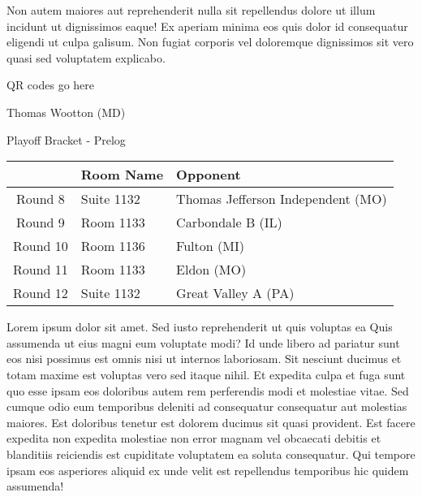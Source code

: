 \documentclass{article}%
\begin{document}
\newline%
Non autem maiores aut reprehenderit nulla sit repellendus dolore ut illum incidunt ut dignissimos eaque! Ex aperiam minima eos quis dolor id consequatur eligendi ut culpa galisum. Non fugiat corporis vel doloremque dignissimos sit vero quasi sed voluptatem explicabo.\newline%
\newline%
%
\vspace*{30pt}%
\begin{center}%
\begin{Huge}%
QR codes go here%
\end{Huge}%
\end{center}%
\newpage%
\begin{center}%
\begin{Huge}%
Thomas Wootton (MD)%
\end{Huge}%
\vspace*{8pt}%
\linebreak%
\begin{Large}%
Playoff Bracket {-} Prelog%
\end{Large}%
\end{center}%
\begin{tabularx}{\textwidth}{|c|Y|Y|}%
\hline%
&Room Name&Opponent\\%
\hline%
Round 8&Suite 1132&Thomas Jefferson Independent (MO)\\%
Round 9&Room 1133&Carbondale B (IL)\\%
Round 10&Room 1136&Fulton (MI)\\%
Round 11&Room 1133&Eldon (MO)\\%
Round 12&Suite 1132&Great Valley A (PA)\\%
\hline%
\end{tabularx}%
\vspace*{8pt}%
\linebreak%
\newline%
\newline%
Lorem ipsum dolor sit amet. Sed iusto reprehenderit ut quis voluptas ea Quis assumenda ut eius magni eum voluptate modi? Id unde libero ad pariatur sunt eos nisi possimus est omnis nisi ut internos laboriosam. Sit nesciunt ducimus et totam maxime est voluptas vero sed itaque nihil. Et expedita culpa et fuga sunt quo esse ipsam eos doloribus autem rem perferendis modi et molestiae vitae.\newline%
\newline%
Sed cumque odio eum temporibus deleniti ad consequatur consequatur aut molestias maiores. Est doloribus tenetur est dolorem ducimus sit quasi provident. Est facere expedita non expedita molestiae non error magnam vel obcaecati debitis et blanditiis reiciendis est cupiditate voluptatem ea soluta consequatur. Qui tempore ipsam eos asperiores aliquid ex unde velit est repellendus temporibus hic quidem assumenda!\newline%
\end{document}
